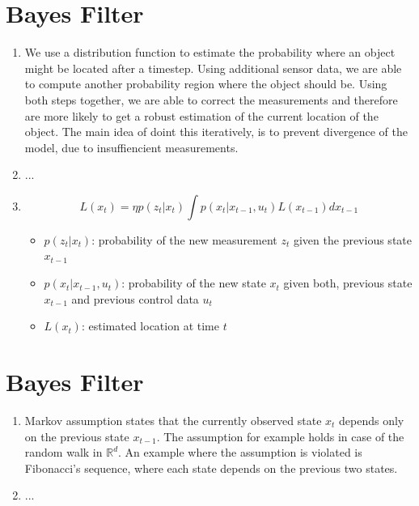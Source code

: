\documentclass[12pt]{article}
\begin{document}
	\section*{Bayes Filter}
	\begin{enumerate}
		\item We use a distribution function to estimate the probability where an object might be located after a timestep. Using additional sensor data, we are able to compute another probability region where the object should be. Using both steps together, we are able to correct the measurements and therefore are more likely to get a robust estimation of the current location of the object. The main idea of doint this iteratively, is to prevent divergence of the model, due to insuffiencient measurements.
		\item ...
		\item 
			\begin{equation*}
				L(x_t) = \eta p(z_t | x_t) \int p(x_t | x_{t - 1}, u_t) L(x_{t-1}) dx_{t-1}
			\end{equation*}
			\begin{itemize}
				\item $p(z_t | x_t)$: probability of the new measurement $z_t$ given the previous state $x_{t-1}$
				\item $p(x_t | x_{t - 1}, u_t)$: probability of the new state $x_t$ given both, previous state $x_{t-1}$ and previous control data $u_t$
				\item $L(x_t)$: estimated location at time $t$
			\end{itemize}
	\end{enumerate}

	\section*{Bayes Filter}
	\begin{enumerate}
		\item Markov assumption states that the currently observed state $x_t$ depends only on the previous state $x_{t-1}$. The assumption for example holds in case of the random walk in $\mathbb{R}^d$. An example where the assumption is violated is Fibonacci's sequence, where each state depends on the previous two states.
		\item ...
	\end{enumerate}

%	
%	
\end{document}
